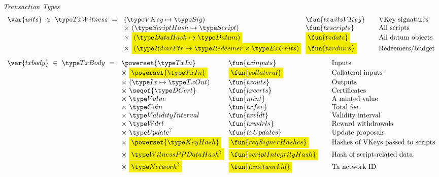\begin{figure*}[htb]
  \emph{Transaction Types}
  \begin{equation*}
    \begin{array}{r@{~~}l@{~~}l@{\qquad}l}
      \var{wits} ~\in~ \TxWitness ~=~
       & (\VKey \mapsto \Sig) & \fun{txwitsVKey} & \text{VKey signatures}\\
       & \times ~(\ScriptHash \mapsto \Script)  & \fun{txscripts} & \text{All scripts}\\
       & \times~ \hldiff{(\DataHash \mapsto \Datum)} & \hldiff{\fun{txdats}} & \text{All datum objects}\\
       & \times ~\hldiff{(\RdmrPtr \mapsto \Redeemer \times \ExUnits)}& \hldiff{\fun{txrdmrs}}& \text{Redeemers/budget}\\
    \end{array}
  \end{equation*}
  \begin{equation*}
    \begin{array}{r@{~~}l@{~~}l@{\qquad}l}
      \var{txbody} ~\in~ \TxBody ~=~
      & \powerset{\TxIn} & \fun{txinputs}& \text{Inputs}\\
      & \times ~\hldiff{\powerset{\TxIn}} & \hldiff{\fun{collateral}} & \text{Collateral inputs}\\
      & \times ~(\Ix \mapsto \TxOut) & \fun{txouts}& \text{Outputs}\\
      & \times~ \seqof{\DCert} & \fun{txcerts}& \text{Certificates}\\
       & \times ~\Value  & \fun{mint} &\text{A minted value}\\
       & \times ~\Coin & \fun{txfee} &\text{Total fee}\\
       & \times ~\ValidityInterval & \fun{txvldt} & \text{Validity interval}\\
       & \times~ \Wdrl  & \fun{txwdrls} &\text{Reward withdrawals}\\
       & \times ~\Update^?  & \fun{txUpdates} & \text{Update proposals}\\
       & \times ~\hldiff{\powerset{\KeyHash}} & \hldiff{\fun{reqSignerHashes}} & \text{Hashes of VKeys passed to scripts}\\
       & \times ~\hldiff{\WitnessPPDataHash^?} & \hldiff{\fun{scriptIntegrityHash}} & \text{Hash of script-related data}\\
       & \times ~\hldiff{\Network^?} & \hldiff{\fun{txnetworkid}} & \text{Tx network ID}\\
    \end{array}

\end{equation*}
\end{figure*}
